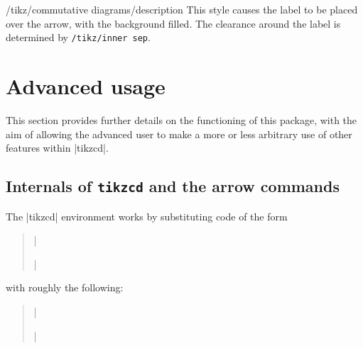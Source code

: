 \documentclass[a4paper]{ltxdoc}
\begin{document}
\begin{stylekey}{/tikz/commutative diagrams/description}
  This style causes the label to be placed over the arrow, with the
  background filled.  The clearance around the label is determined by
  \texttt{/tikz/inner sep}.

\begin{codeexample}[]
\end{codeexample}
\end{stylekey}

\section{Advanced usage}
\label{sec:advanced-usage}

This section provides further details on the functioning of this
package, with the aim of allowing the advanced user to make a more or
less arbitrary use of other \tikzname{} features within |{tikzcd}|.

\subsection{Internals of \texttt{tikzcd} and the arrow commands}
\label{sec:intern-arrow-comm}

The |{tikzcd}| environment works by substituting code of the form
\begin{verse}
  ||
\end{verse}
with roughly the following:
\begin{verse}
  ||
\end{verse}
\end{document}
